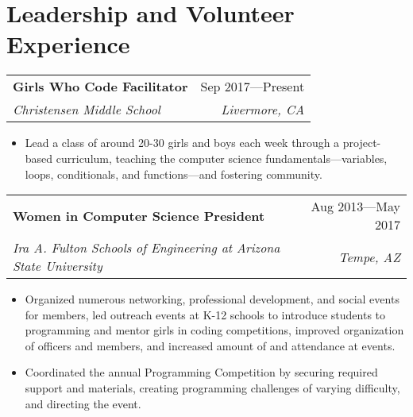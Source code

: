 \documentclass[letterpaper,11pt]{article}
\makeatletter
\newcommand{\resumeItem}[1]{
	\item\small{
		#1
		\vspace{-0.5pt}
	}
}
\newcommand{\resumeSubheading}[4]{
	\vspace{-1pt}\item
	\begin{tabular*}{0.97\textwidth}{l@{\extracolsep{\fill}}r}
		\textbf{#1} & #2 \\
		\textit{\small#3} & \textit{\small #4} \\
	\end{tabular*}\vspace{-5pt}
}
\newcommand{\resumeSubHeadingListStart}{\begin{description}[leftmargin=*]}
\newcommand{\resumeSubHeadingListEnd}{\end{description}}
\newcommand{\resumeItemListStart}{\begin{itemize}[rightmargin=\dimexpr\linewidth-0.93\textwidth-\leftmargin\relax]}
\newcommand{\resumeItemListEnd}{\end{itemize}\vspace{-5pt}}
\makeatother
\begin{document}
	\section{Leadership and Volunteer Experience}
	\resumeSubHeadingListStart
	\resumeSubheading
	{Girls Who Code Facilitator}{Sep 2017---Present}
	{Christensen Middle School}{Livermore, CA}
	\resumeItemListStart
	\resumeItem
	{Lead a class of around 20-30 girls and boys each week through a project-based curriculum, teaching the computer science fundamentals---variables, loops, conditionals, and functions---and fostering community.}
	\resumeItemListEnd
	\resumeSubheading
	{Women in Computer Science President}{Aug 2013---May 2017}
	{Ira A. Fulton Schools of Engineering at Arizona State University}{Tempe, AZ}
	\resumeItemListStart
	\resumeItem{Organized numerous networking, professional development, and social events for members, led outreach events at K-12 schools to introduce students to programming and mentor girls in coding competitions, improved organization of officers and members, and increased amount of and attendance at events.}
	\resumeItem{Coordinated the annual Programming Competition by securing required support and materials, creating programming challenges of varying difficulty, and directing the event.}
	\resumeItemListEnd
	\resumeSubHeadingListEnd
	
\end{document}
